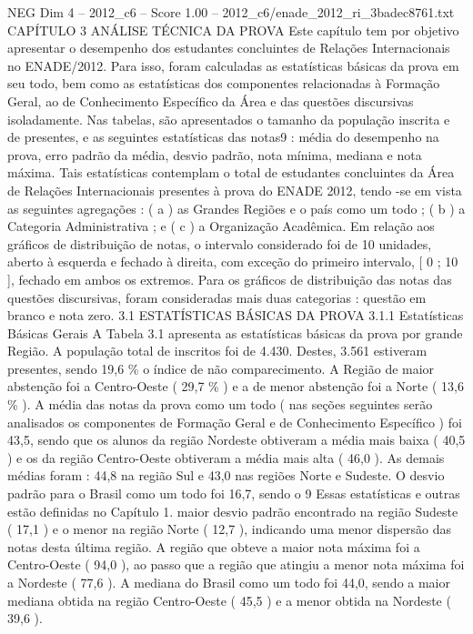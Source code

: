\begin{textsample}{NEG Dim 4 – 2012\_c6 – Score 1.00 – 2012\_c6/enade\_2012\_ri\_3badec8761.txt}  \label{ex:f4_neg_237}
CAPÍTULO 3 ANÁLISE TÉCNICA DA PROVA Este capítulo tem por objetivo apresentar o desempenho dos estudantes concluintes de Relações Internacionais no ENADE/2012.
Para isso, foram calculadas as estatísticas básicas da prova em seu todo, bem como as estatísticas dos componentes relacionadas à Formação Geral, ao de Conhecimento Específico da Área e das questões discursivas isoladamente.
Nas tabelas, são apresentados o tamanho da população inscrita e de presentes, e as seguintes estatísticas das notas9 : média do desempenho na prova, erro padrão da média, desvio padrão, nota mínima, mediana e nota máxima.
Tais estatísticas contemplam o total de estudantes concluintes da Área de Relações Internacionais presentes à prova do ENADE 2012, tendo -se em vista as seguintes agregações : ( a ) as Grandes Regiões e o país como um todo ; ( b ) a Categoria Administrativa ; e ( c ) a Organização Acadêmica.
Em relação aos gráficos de distribuição de notas, o intervalo considerado foi de 10 unidades, aberto à esquerda e fechado à direita, com exceção do primeiro intervalo, [ 0 ; 10 ], fechado em ambos os extremos.
Para os gráficos de distribuição das notas das questões discursivas, foram consideradas mais duas categorias : questão em branco e nota zero. 3.1 ESTATÍSTICAS BÁSICAS DA PROVA 3.1.1 Estatísticas Básicas Gerais A Tabela 3.1 apresenta as estatísticas básicas da prova por grande Região.
A população total de inscritos foi de 4.430.
Destes, 3.561 estiveram presentes, sendo 19,6 \% o índice de não comparecimento.
A Região de maior abstenção foi a Centro-Oeste ( 29,7 \% ) e a de menor abstenção foi a Norte ( 13,6 \% ).
A média das notas da prova como um todo ( nas seções seguintes serão analisados os componentes de Formação Geral e de Conhecimento Específico ) foi 43,5, sendo que os alunos da região Nordeste obtiveram a média mais baixa ( 40,5 ) e os da região Centro-Oeste obtiveram a média mais alta ( 46,0 ).
As demais médias foram : 44,8 na região Sul e 43,0 nas regiões Norte e Sudeste.
O desvio padrão para o Brasil como um todo foi 16,7, sendo o 9 Essas estatísticas e outras estão definidas no Capítulo 1. maior desvio padrão encontrado na região Sudeste ( 17,1 ) e o menor na região Norte ( 12,7 ), indicando uma menor dispersão das notas desta última região.
A região que obteve a maior nota máxima foi a Centro-Oeste ( 94,0 ), ao passo que a região que atingiu a menor nota máxima foi a Nordeste ( 77,6 ).
A mediana do Brasil como um todo foi 44,0, sendo a maior mediana obtida na região Centro-Oeste ( 45,5 ) e a menor obtida na Nordeste ( 39,6 ).

\end{textsample}
